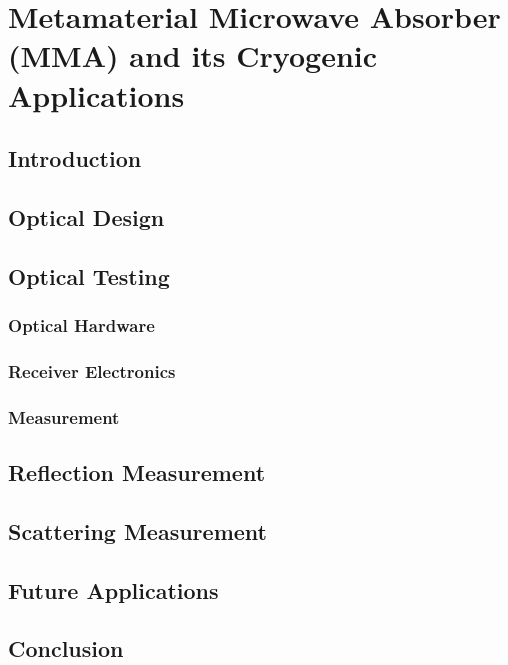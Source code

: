 \chapter{Metamaterial Microwave Absorber (MMA) and its Cryogenic Applications}
\label{ch:mma}
\section{Introduction}
\section{Optical Design}
\section{Optical Testing}
\subsection{Optical Hardware}
\subsection{Receiver Electronics}
\subsection{Measurement}
\section{Reflection Measurement}
\section{Scattering Measurement}
\section{Future Applications}
\section{Conclusion}